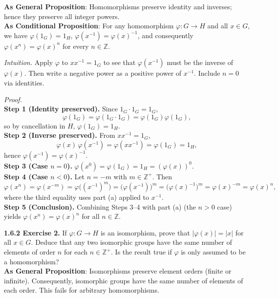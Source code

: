 \documentclass[12pt]{article}
\theoremstyle{definition}
\begin{document}
\noindent\textbf{As General Proposition}: Homomorphisms preserve identity and inverses; hence they preserve all integer powers.\\

\noindent \textbf{As Conditional Proposition}: For any homomorphism $\varphi:G\to H$ and all $x\in G$, we have $\varphi(1_G)=1_H$, $\varphi(x^{-1})=\varphi(x)^{-1}$, and consequently $\varphi(x^n)=\varphi(x)^n$ for every $n\in\mathbb{Z}$.

\newpage

\dotfill

\emph{Intuition.} Apply $\varphi$ to $xx^{-1}=1_G$ to see that $\varphi(x^{-1})$ must be the inverse of $\varphi(x)$. Then write a negative power as a positive power of $x^{-1}$. Include $n=0$ via identities.\\

\dotfill

\emph{Proof.}\\
\textbf{Step 1 (Identity preserved).} Since $1_G\cdot1_G=1_G$,
\[
\varphi(1_G)=\varphi(1_G\cdot1_G)=\varphi(1_G)\varphi(1_G),
\]
so by cancellation in $H$, $\varphi(1_G)=1_H$.\\
\textbf{Step 2 (Inverse preserved).} From $x x^{-1}=1_G$,
\[
\varphi(x)\,\varphi(x^{-1})=\varphi(xx^{-1})=\varphi(1_G)=1_H,
\]
hence $\varphi(x^{-1})=\varphi(x)^{-1}$.\\
\textbf{Step 3 (Case $n=0$).} $\varphi(x^0)=\varphi(1_G)=1_H=(\varphi(x))^0$.\\
\textbf{Step 4 (Case $n<0$).} Let $n=-m$ with $m\in\mathbb{Z}^+$. Then
\[
\varphi(x^n)=\varphi(x^{-m})=\varphi\big((x^{-1})^{m}\big)
=\big(\varphi(x^{-1})\big)^m
=\big(\varphi(x)^{-1}\big)^m
=\varphi(x)^{-m}
=\varphi(x)^n,
\]
where the third equality uses part (a) applied to $x^{-1}$.\\
\textbf{Step 5 (Conclusion).} Combining Steps 3–4 with part (a) (the $n>0$ case) yields $\varphi(x^n)=\varphi(x)^n$ for all $n\in\mathbb{Z}$.

\newpage

\noindent \textbf{1.6.2 Exercise 2.} If $\varphi:G\to H$ is an isomorphism, prove that $|\varphi(x)|=|x|$ for all $x\in G$. Deduce that any two isomorphic groups have the same number of elements of order $n$ for each $n\in\mathbb{Z}^+$. Is the result true if $\varphi$ is only assumed to be a homomorphism?\\ %

\noindent\textbf{As General Proposition}: Isomorphisms preserve element orders (finite or infinite). Consequently, isomorphic groups have the same number of elements of each order. This fails for arbitrary homomorphisms.\\
\end{document}
